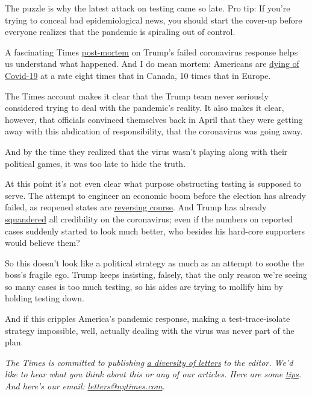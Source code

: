 The puzzle is why the latest attack on testing came so late. Pro tip: If
you're trying to conceal bad epidemiological news, you should start the
cover-up before everyone realizes that the pandemic is spiraling out of
control.

A fascinating Times
\href{https://www.nytimes.com/2020/07/18/us/politics/trump-coronavirus-response-failure-leadership.html?action=click\&module=Well\&pgtype=Homepage\&section=Politics}{post-mortem}
on Trump's failed coronavirus response helps us understand what
happened. And I do mean mortem: Americans are
\href{https://www.washingtonpost.com/health/2020/07/19/coronavirus-us-failure/}{dying
of Covid-19} at a rate eight times that in Canada, 10 times that in
Europe.

The Times account makes it clear that the Trump team never seriously
considered trying to deal with the pandemic's reality. It also makes it
clear, however, that officials convinced themselves back in April that
they were getting away with this abdication of responsibility, that the
coronavirus was going away.

And by the time they realized that the virus wasn't playing along with
their political games, it was too late to hide the truth.

At this point it's not even clear what purpose obstructing testing is
supposed to serve. The attempt to engineer an economic boom before the
election has already failed, as reopened states are
\href{https://twitter.com/econjared/status/1285206998439600130}{reversing
course}. And Trump has already
\href{https://www.washingtonpost.com/politics/trump-faces-rising-disapproval-and-widespread-distrust-on-coronavirus-post-abc-poll-finds/2020/07/16/04aa9db2-c79d-11ea-a99f-3bbdffb1af38_story.html}{squandered}
all credibility on the coronavirus; even if the numbers on reported
cases suddenly started to look much better, who besides his hard-core
supporters would believe them?

So this doesn't look like a political strategy as much as an attempt to
soothe the boss's fragile ego. Trump keeps insisting, falsely, that the
only reason we're seeing so many cases is too much testing, so his aides
are trying to mollify him by holding testing down.

And if this cripples America's pandemic response, making a
test-trace-isolate strategy impossible, well, actually dealing with the
virus was never part of the plan.

\emph{The Times is committed to publishing}
\href{https://www.nytimes.com/2019/01/31/opinion/letters/letters-to-editor-new-york-times-women.html}{\emph{a
diversity of letters}} \emph{to the editor. We'd like to hear what you
think about this or any of our articles. Here are some}
\href{https://help.nytimes.com/hc/en-us/articles/115014925288-How-to-submit-a-letter-to-the-editor}{\emph{tips}}\emph{.
And here's our email:}
\href{mailto:letters@nytimes.com}{\emph{letters@nytimes.com}}\emph{.}

